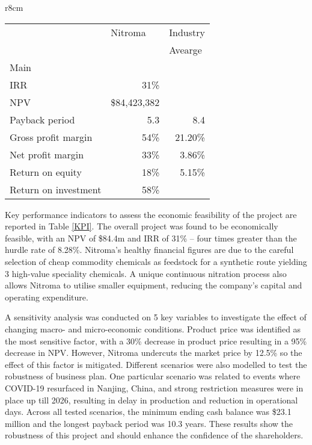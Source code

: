 \begin{wraptable}{r}{8cm}
\centering
\caption{Nitroma's KPIs comparing to industry}
\label{KPI}
\begin{tabular}{l|r|l}
\hline
\textbf{}            & \multicolumn{1}{l|}{Nitroma} & \multicolumn{1}{c}{Industry} \\
                     & \multicolumn{1}{l|}{}        & Avearge                      \\ \hline
Main                 & \multicolumn{1}{l|}{}        &                              \\
IRR                  & 31\%                         &                              \\
NPV                  & \$84,423,382                 &                              \\
Payback period       & 5.3                          & \multicolumn{1}{r}{8.4}      \\
Gross profit margin  & 54\%                         & \multicolumn{1}{r}{21.20\%}  \\
Net profit margin    & 33\%                         & \multicolumn{1}{r}{3.86\%}   \\
Return on equity     & 18\%                         & \multicolumn{1}{r}{5.15\%}   \\
Return on investment & 58\%                         &                              \\ \hline
\end{tabular}
\end{wraptable}


Key performance indicators to assess the economic feasibility of the project are reported in Table \ref{KPI}. The overall project was found to be economically feasible, with an NPV of \$84.4m and IRR of 31\% – four times greater than the hurdle rate of 8.28\%. Nitroma’s healthy financial figures are due to the careful selection of cheap commodity chemicals as feedstock for a synthetic route yielding 3 high-value speciality chemicals. A unique continuous nitration process also allows Nitroma to utilise smaller equipment, reducing the company’s capital and operating expenditure.

A sensitivity analysis was conducted on 5 key variables to investigate the effect of changing macro- and micro-economic conditions. Product price was identified as the most sensitive factor, with a 30\% decrease in product price resulting in a 95\% decrease in NPV. However, Nitroma undercuts the market price by 12.5\% so the effect of this factor is mitigated. Different scenarios were also modelled to test the robustness of business plan. One particular scenario was related to events where COVID-19 resurfaced in Nanjing, China, and strong restriction measures were in place up till 2026, resulting in delay in production and reduction in operational days. Across all tested scenarios, the minimum ending cash balance was \$23.1 million and the longest payback period was 10.3 years. These results show the robustness of this project and should enhance the confidence of the shareholders.